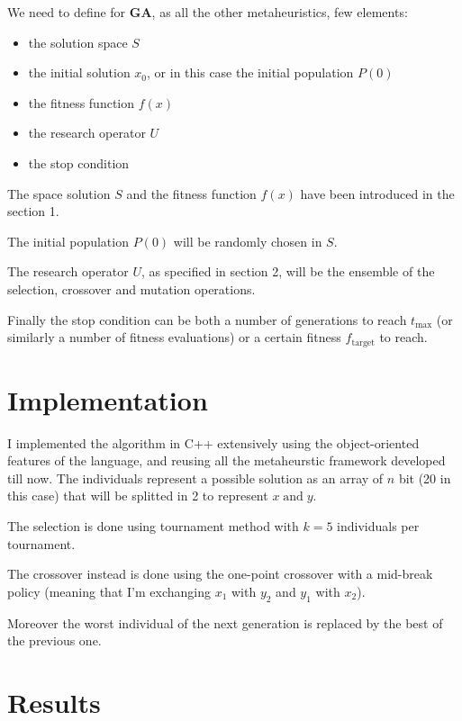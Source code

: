 \documentclass{article}
\newcommand{\tmop}[1]{\ensuremath{\operatorname{#1}}}
\newcommand{\tmstrong}[1]{\textbf{#1}}
\begin{document}
We need to define for {\tmstrong{GA}}, as all the other metaheuristics, few
elements:
\begin{itemize}
  \item the solution space $S$
  
  \item the initial solution $x_0$, or in this case the initial population $P
  (0)$
  
  \item the fitness function $f (x)$
  
  \item the research operator $U$
  
  \item the stop condition
\end{itemize}
The space solution $S$ and the fitness function $f (x)$ have been introduced
in the section 1.

The initial population $P (0)$ will be randomly chosen in $S$.

The research operator $U$, as specified in section 2, will be the ensemble of
the selection, crossover and mutation operations.

Finally the stop condition can be both a number of generations to reach
$t_{\max}$ (or similarly a number of fitness evaluations) or a certain fitness
$f_{\tmop{target}}$ to reach.

\section{Implementation}

I implemented the algorithm in C++ extensively using the object-oriented
features of the language, and reusing all the metaheurstic framework developed
till now. The individuals represent a possible solution as an array of $n$ bit
(20 in this case) that will be splitted in 2 to represent $x \tmop{and} y$.

The selection is done using tournament method with $k = 5$ individuals per
tournament.

The crossover instead is done using the one-point crossover with a mid-break
policy (meaning that I'm exchanging $x_1$ with $y_2$ and $y_1$ with $x_2$).

Moreover the worst individual of the next generation is replaced by the best
of the previous one. \ \

\section{Results}
\end{document}
